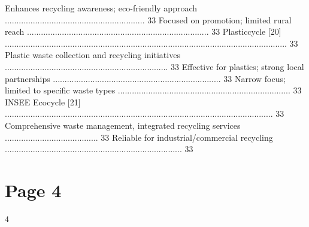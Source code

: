 \documentclass{article}
\begin{document}
Enhances recycling awareness; eco-friendly approach ............................................................ 33 
Focused on promotion; limited rural reach .............................................................................. 33 
Plasticcycle [20] ......................................................................................................................... 33 
Plastic waste collection and recycling initiatives ...................................................................... 33 
Effective for plastics; strong local partnerships ........................................................................ 33 
Narrow focus; limited to specific waste types .......................................................................... 33 
INSEE Ecocycle [21] ................................................................................................................... 33 
Comprehensive waste management, integrated recycling services ........................................ 33 
Reliable for industrial/commercial recycling ............................................................................ 33 

\section*{Page 4}
   
 
 4  
 
\end{document}
